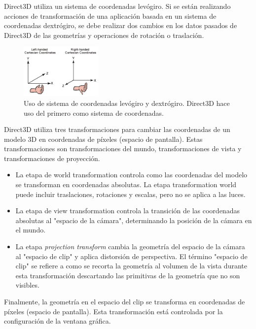 \documentclass[a4paper]{book}
\begin{document}
Direct3D utiliza un sistema de coordenadas levógiro. Si se están realizando acciones de transformación de una aplicación
basada en un sistema de coordenadas dextrógiro, se debe realizar dos cambios en los datos pasados de Direct3D de las
geometrías y operaciones de rotación o traslación. \cite{directx:_coordinate_system}

\begin{figure}[H]
    \centering
    \includegraphics[width=4cm, keepaspectratio]{img/leftrght.png}
    \caption{Uso de sistema de coordenadas levógiro y dextrógiro. Direct3D hace uso del primero como sistema de coordenadas.}
    \label{leftrght}
\end{figure}

Direct3D utiliza tres transformaciones para cambiar las coordenadas de un modelo 3D en coordenadas de píxeles (espacio de pantalla).
Estas transformaciones son transformaciones del mundo, transformaciones de vista y transformaciones de proyección.

\begin{itemize}
  \item La etapa de world transformation controla como las coordenadas del modelo se transforman en coordenadas absolutas.
  La etapa transformation world puede incluir traslaciones, rotaciones y escalas, pero no se aplica a las luces.

  \item La etapa de view transformation controla la transición de las coordenadas absolutas al "espacio de la cámara",
  determinando la posición de la cámara en el mundo.

  \item La etapa \textit{projection transform} cambia la geometría del espacio de la cámara al "espacio de clip" y aplica
  distorsión de perspectiva. El término "espacio de clip" se refiere a como se recorta la geometría al volumen
  de la vista durante esta transformación descartando las primitivas de la geometría que no son visibles.

\end{itemize}

Finalmente, la geometría en el espacio del clip se transforma en coordenadas de píxeles (espacio de pantalla).
Esta transformación está controlada por la configuración de la ventana gráfica.
\end{document}

